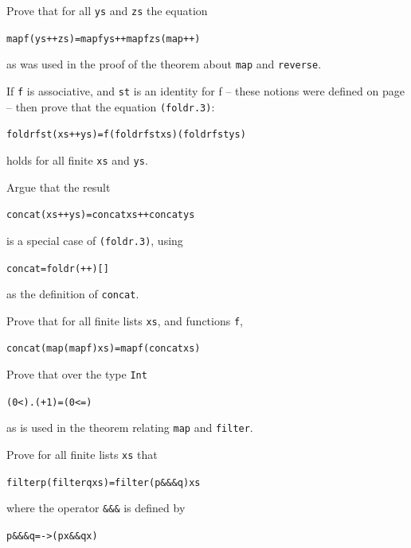 \begin{exercises}


\item 
Prove that for all \texttt{ys} and \texttt{zs} the equation
\begin{alltt}
map f (ys++zs) = map f ys ++ map f zs\hfill (map++)
\end{alltt}
as was used in the proof of the theorem about \texttt{map} and
\texttt{reverse}.


\item
If \texttt{f} is associative, and \texttt{st} is an identity for {\mi
f} -- these notions were defined on page \pageref{assocId} -- then prove that
the equation \texttt{(foldr.3)}:
\begin{alltt}
foldr f st (xs++ys) = f (foldr f st xs) (foldr f st ys)
\end{alltt}
holds for all
finite \texttt{xs} and \texttt{ys}.

\item
Argue that the result
\begin{alltt}
concat (xs ++ ys) = concat xs ++ concat ys
\end{alltt} 
is a special case of \texttt{(foldr.3)},  using 
\begin{alltt}
concat = foldr (++) []
\end{alltt}
as the definition of \texttt{concat}.

\item
Prove that for all finite lists \texttt{xs}, and functions \texttt{f},
\begin{alltt}
concat (map (map f) xs) = map f (concat xs)
\end{alltt}

\item
Prove that over the type \texttt{Int}
\begin{alltt}
(0<) . (+1) = (0<=)
\end{alltt}
as is used in the theorem relating \texttt{map} and \texttt{filter}.

\item
Prove for all finite lists \texttt{xs} that
\begin{alltt}
filter p (filter q xs) = filter (p \&\&\& q) xs
\end{alltt}
where the operator \texttt{\&\&\&} is defined by
\begin{alltt}
p \&\&\& q =  -> (p x \&\& q x)
\end{alltt}

\end{exercises}

